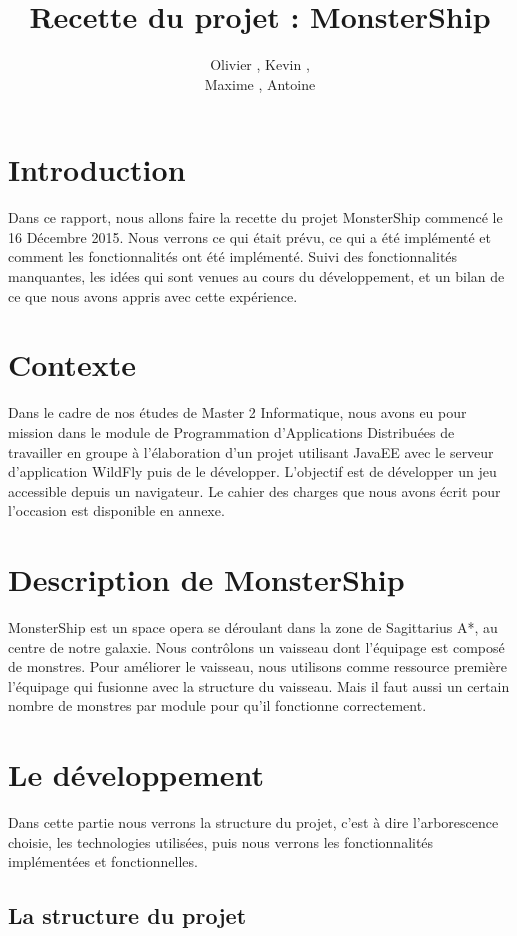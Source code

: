 \documentclass[a4paper,11pt]{report}
\title{Recette du projet : MonsterShip}
\author{Olivier \bsc{Boissard}, Kevin \bsc{Boulala},\\Maxime \bsc{Dubois}, Antoine \bsc{Lavier}}
\begin{document}
\maketitle
\setcounter{tocdepth}{1}
\tableofcontents

\chapter{Introduction}
  Dans ce rapport, nous allons faire la recette du projet MonsterShip commencé le 16 Décembre 2015. Nous verrons ce qui était prévu, ce qui a été implémenté et comment les fonctionnalités ont été implémenté. Suivi des fonctionnalités manquantes, les idées qui sont venues au cours du développement, et un bilan de ce que nous avons appris avec cette expérience.
  
\chapter{Contexte}
  Dans le cadre de nos études de Master 2 Informatique, nous avons eu pour mission dans le module de Programmation d'Applications Distribuées de travailler en groupe à l'élaboration d'un projet utilisant JavaEE avec le serveur d'application WildFly puis de le développer. L'objectif est de développer un jeu accessible depuis un navigateur. Le cahier des charges que nous avons écrit pour l'occasion est disponible en annexe.

\chapter{Description de MonsterShip}
  MonsterShip est un space opera se déroulant dans la zone de Sagittarius A*, au centre de notre galaxie. Nous contrôlons un vaisseau dont l'équipage est composé de monstres. Pour améliorer le vaisseau, nous utilisons comme ressource première l'équipage qui fusionne avec la structure du vaisseau. Mais il faut aussi un certain nombre de monstres par module pour qu'il fonctionne correctement.

\chapter{Le développement}
  Dans cette partie nous verrons la structure du projet, c'est à dire l'arborescence choisie, les technologies utilisées, puis nous verrons les fonctionnalités implémentées et fonctionnelles.

  \section{La structure du projet}
\end{document}
